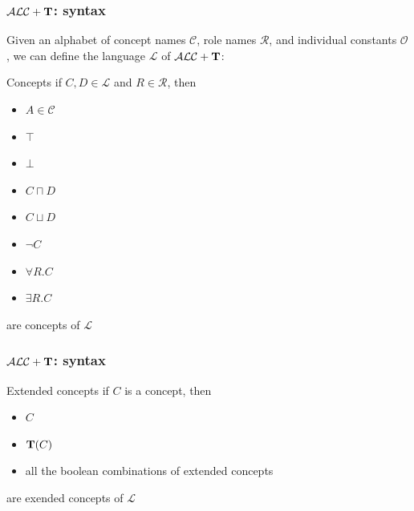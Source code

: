 \documentclass[serif,mathserif]{beamer}
\newcommand{\tip}{{\bf T}}
\newcommand{\alct}{\mathcal{ALC}+\tip}
\begin{document}
\begin{frame}
	\frametitle{$\alct$: syntax}
	
	\small
	Given an alphabet of concept names $\mathcal{C}$, role names $\mathcal{R}$, and individual constants $\mathcal{O}$, we can define the language $\mathcal{L}$ of $\alct$:
	
	\normalsize

	\begin{block}{Concepts}
	if $C, D \in \mathcal{L}$ and $R \in \mathcal{R}$, then
	\begin{multicols}{2}
		\begin{itemize}
		\item $A \in \mathcal{C}$
		\item $\top$
		\item $\bot$
		\item $C\sqcap D$
		\item $C \sqcup D$
		\item $\neg C$
		\item $\forall R.C$
		\item $\exists R.C$
		\end{itemize}
	\end{multicols}
	are concepts of $\mathcal{L}$
	\end{block}
	
\end{frame}

\begin{frame}
	\frametitle{$\alct$: syntax}
	\begin{block}{Extended concepts}
	if $C$ is a concept, then
	\begin{multicols}{2}
		\begin{itemize}
		\item $C$
		\item \alert{$\tip(C)$}		
		\item all the boolean combinations of extended concepts
		\end{itemize}
	\end{multicols}
	are exended concepts of $\mathcal{L}$
	\end{block}
\end{frame}
\end{document}
